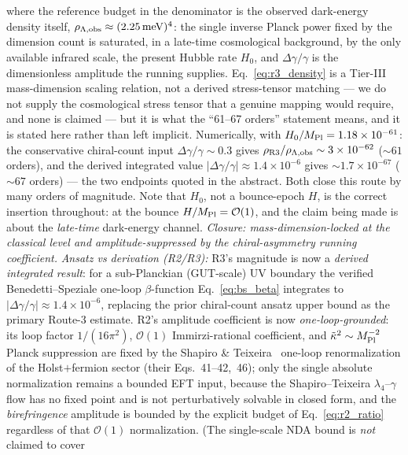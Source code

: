 \documentclass[aps,prd,twocolumn,superscriptaddress,showpacs,preprintnumbers,nofootinbib,longbibliography,floatfix]{revtex4-2}
\begin{document}
where the reference budget in the denominator is the observed dark-energy
density itself, $\rho_{\Lambda,\rm obs}\approx(2.25\,\text{meV})^4$: the
single inverse Planck power fixed by the dimension count is saturated, in
a late-time cosmological background, by the only available infrared
scale, the present Hubble rate $H_0$, and $\Delta\gamma/\gamma$ is the
dimensionless amplitude the running supplies.
Eq.~\eqref{eq:r3_density} is a Tier-III mass-dimension scaling relation,
not a derived stress-tensor matching --- we do not supply the
cosmological stress tensor that a genuine mapping would require, and none
is claimed --- but it is what the ``61--67 orders'' statement means, and
it is stated here rather than left implicit.
Numerically, with $H_0/M_{\rm Pl}=1.18\times10^{-61}$: the conservative
chiral-count input $\Delta\gamma/\gamma\sim0.3$ gives
$\rho_{\rm R3}/\rho_{\Lambda,\rm obs}\sim3\times10^{-62}$ (${\sim}61$
orders), and the derived integrated value
$|\Delta\gamma/\gamma|\approx1.4\times10^{-6}$ gives
${\sim}1.7\times10^{-67}$ (${\sim}67$ orders) --- the two endpoints
quoted in the abstract. Both close this route by many orders of
magnitude. Note that $H_0$, not a bounce-epoch $H$, is the correct
insertion throughout: at the bounce $H/M_{\rm Pl}=\mathcal{O}(1)$, and
the claim being made is about the \emph{late-time} dark-energy channel.
\emph{Closure: mass-dimension-locked at the classical level
and amplitude-suppressed by the chiral-asymmetry running coefficient.}
\emph{Ansatz vs derivation (R2/R3):} R3's magnitude is now a
\emph{derived integrated result}: for a sub-Planckian (GUT-scale) UV
boundary the verified Benedetti--Speziale one-loop $\beta$-function
Eq.~\eqref{eq:bs_beta} integrates to $|\Delta\gamma/\gamma|\approx
1.4\times10^{-6}$, replacing the prior chiral-count ansatz upper bound as
the primary Route-3 estimate. R2's amplitude coefficient is now
\emph{one-loop-grounded}: its loop factor $1/(16\pi^2)$,
$\mathcal{O}(1)$ Immirzi-rational coefficient, and
$\tilde\kappa^2\sim M_{\rm Pl}^{-2}$ Planck suppression are fixed by the Shapiro
\& Teixeira~\cite{ShapiroTeixeira2014} one-loop renormalization of the
Holst${+}$fermion sector (their Eqs.~41--42,~46); only the single
absolute normalization remains a bounded EFT input, because the
Shapiro--Teixeira $\lambda_4$--$\gamma$ flow has no fixed point and is
not perturbatively solvable in closed form, and the \emph{birefringence}
amplitude is bounded by the explicit budget of
Eq.~\eqref{eq:r2_ratio} regardless of that $\mathcal{O}(1)$
normalization. (The single-scale NDA bound is \emph{not} claimed to cover
\end{document}
